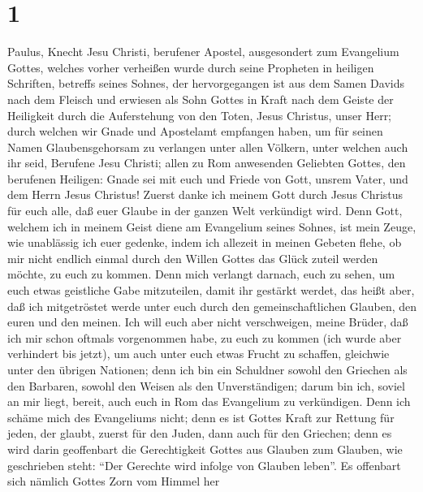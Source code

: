 \hypertarget{section}{%
\section{1}\label{section}}

 Paulus, Knecht Jesu Christi, berufener Apostel,
ausgesondert zum Evangelium Gottes,  welches vorher
verheißen wurde durch seine Propheten in heiligen Schriften,
 betreffs seines Sohnes, der hervorgegangen ist aus dem
Samen Davids nach dem Fleisch  und erwiesen als Sohn
Gottes in Kraft nach dem Geiste der Heiligkeit durch die Auferstehung
von den Toten, Jesus Christus, unser Herr;  durch welchen
wir Gnade und Apostelamt empfangen haben, um für seinen Namen
Glaubensgehorsam zu verlangen unter allen Völkern,  unter
welchen auch ihr seid, Berufene Jesu Christi;  allen zu
Rom anwesenden Geliebten Gottes, den berufenen Heiligen: Gnade sei mit
euch und Friede von Gott, unsrem Vater, und dem Herrn Jesus Christus!
 Zuerst danke ich meinem Gott durch Jesus Christus für
euch alle, daß euer Glaube in der ganzen Welt verkündigt wird.
 Denn Gott, welchem ich in meinem Geist diene am
Evangelium seines Sohnes, ist mein Zeuge, wie unablässig ich euer
gedenke,  indem ich allezeit in meinen Gebeten flehe, ob
mir nicht endlich einmal durch den Willen Gottes das Glück zuteil werden
möchte, zu euch zu kommen.  Denn mich verlangt darnach,
euch zu sehen, um euch etwas geistliche Gabe mitzuteilen, damit ihr
gestärkt werdet,  das heißt aber, daß ich mitgetröstet
werde unter euch durch den gemeinschaftlichen Glauben, den euren und den
meinen.  Ich will euch aber nicht verschweigen, meine
Brüder, daß ich mir schon oftmals vorgenommen habe, zu euch zu kommen
(ich wurde aber verhindert bis jetzt), um auch unter euch etwas Frucht
zu schaffen, gleichwie unter den übrigen Nationen;  denn
ich bin ein Schuldner sowohl den Griechen als den Barbaren, sowohl den
Weisen als den Unverständigen;  darum bin ich, soviel an
mir liegt, bereit, auch euch in Rom das Evangelium zu verkündigen.
 Denn ich schäme mich des Evangeliums nicht; denn es ist
Gottes Kraft zur Rettung für jeden, der glaubt, zuerst für den Juden,
dann auch für den Griechen;  denn es wird darin
geoffenbart die Gerechtigkeit Gottes aus Glauben zum Glauben, wie
geschrieben steht: ``Der Gerechte wird infolge von Glauben leben''.
 Es offenbart sich nämlich Gottes Zorn vom Himmel her
